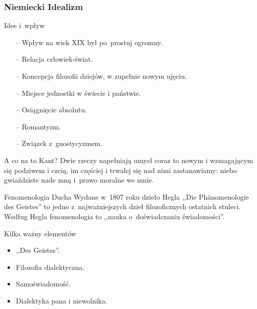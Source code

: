 \documentclass{beamer}  %
\begin{document}
\begin{frame}
  \frametitle{Niemiecki Idealizm}

  \begin{block}{Idee i~wpływ}
    \begin{itemize}
      \pause
    \item[--] Wpływ na wiek XIX był po~prostuj ogromny. \pause
    \item[--] Relacja człowiek-świat. \pause
    \item[--] Koncepcja filozofii dziejów, w zupełnie nowym ujęciu.
      \pause
    \item[--] Miejsce jednostki w świecie i państwie. \pause
    \item[--] Osiągnięcie absolutu. \pause
    \item[--] Romantyzm. \pause
    \item[--] Związek z~gnostycyzmem.
    \end{itemize}
  \end{block}
  \pause

  \begin{block}{A co na to Kant?}
    \pause Dwie rzeczy napełniają umysł coraz to nowym i wzmagającym
    się podziwem i czcią, im częściej i trwalej się nad nimi
    zastanawiamy: niebo gwiaździste nade mną i~prawo moralne we mnie.
  \end{block}

    \begin{block}{Fenomenologia Ducha}
      Wydane w~1807 roku dzieło Hegla ,,Die Ph\"{a}nomenologie
      \newline des Geistes'' to jedno z~najważniejszych dzieł
      filozoficznych ostatnich stuleci. Według Hegla fenomenologia to
      ,,nauka o~doświadczaniu świadomości''.
    \end{block}
    \pause

    \begin{block}{Kilka ważny elementów}
      \begin{itemize}
      \item ,,Des Geistes''.
      \item Filozofia dialektyczna.
      \item Samoświadomość.
      \item Dialektyka pana i niewolnika.
      \end{itemize}
    \end{block}


\end{frame}
\end{document}
